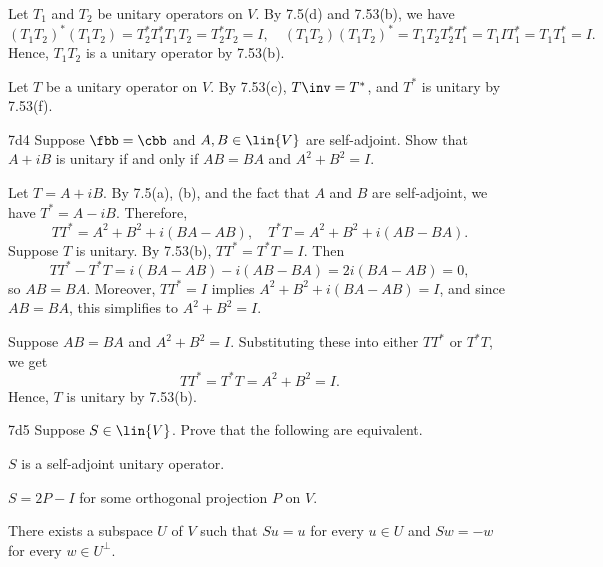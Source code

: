 \begin{solenum}
    \item Let $T_1$ and $T_2$ be unitary operators on $V$.
    By 7.5(d) and 7.53(b), we have
    \[
        (T_1T_2)^\ast (T_1T_2) = T_2^\ast T_1^\ast T_1 T_2 = T_2^\ast T_2 = I, \quad 
        (T_1T_2)(T_1T_2)^\ast = T_1T_2 T_2^\ast T_1^\ast = T_1 I T_1^\ast = T_1T_1^\ast = I.
    \]
    Hence, $T_1T_2$ is a unitary operator by 7.53(b).
    \item Let $T$ be a unitary operator on $V$.
    By 7.53(c), $T\inv = T^\ast$, and $T^\ast$ is unitary by 7.53(f).
\end{solenum}

\begin{exercise}{7d4}
    Suppose $\fbb = \cbb$ and $A, B \in \lin{V}$ are self-adjoint.
    Show that $A + iB$ is unitary if and only if $AB = BA$ and $A^2 + B^2 = I$.
\end{exercise}

\begin{sol}
    Let $T = A + iB$.
    By 7.5(a), (b), and the fact that $A$ and $B$ are self-adjoint, we have $T^\ast = A - iB$.
    Therefore,
    \[
        TT^\ast = A^2 + B^2 + i(BA - AB), \quad T^\ast T = A^2 + B^2 + i(AB - BA).
    \]
    \rightimp Suppose $T$ is unitary.
    By 7.53(b), $TT^\ast = T^\ast T = I$.
    Then
    \[
        TT^\ast - T^\ast T = i(BA - AB) - i(AB - BA) = 2i(BA - AB) = 0,
    \]
    so $AB = BA$.
    Moreover, $TT^\ast = I$ implies $A^2 + B^2 + i(BA - AB) = I$, and since $AB = BA$, this simplifies to $A^2 + B^2 = I$.

    \leftimp Suppose $AB = BA$ and $A^2 + B^2 = I$.
    Substituting these into either $TT^\ast$ or $T^\ast T$, we get
    \[
        TT^\ast = T^\ast T = A^2 + B^2 = I.
    \]
    Hence, $T$ is unitary by 7.53(b).
\end{sol}

\begin{exercise}{7d5}
    Suppose $S \in \lin{V}$.
    Prove that the following are equivalent.
    \begin{subexercises}
        \item $S$ is a self-adjoint unitary operator.
        \item $S = 2P - I$ for some orthogonal projection $P$ on $V$.
        \item There exists a subspace $U$ of $V$ such that $Su = u$ for every $u \in U$ and $Sw = -w$ for every $w \in U^\perp$.
    \end{subexercises}
\end{exercise}

